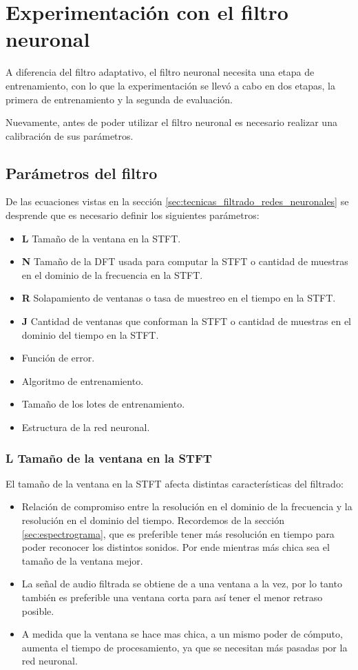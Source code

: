 \section{Experimentación con el filtro neuronal}

A diferencia del filtro adaptativo, el filtro neuronal necesita una etapa de entrenamiento, con lo que la experimentación se llevó a cabo en dos etapas, la primera de entrenamiento y la segunda de evaluación. 

Nuevamente, antes de poder utilizar el filtro neuronal es necesario realizar una calibración de sus parámetros.

\subsection{Parámetros del filtro}

De las ecuaciones vistas en la sección \ref{sec:tecnicas_filtrado_redes_neuronales} se desprende que es necesario definir los siguientes parámetros:

\begin{itemize}
	\item \textbf{L} Tamaño de la ventana en la STFT.
	\item \textbf{N} Tamaño de la DFT usada para computar la STFT o cantidad de muestras en el dominio de la frecuencia en la STFT.
	\item \textbf{R} Solapamiento de ventanas o tasa de muestreo en el tiempo en la STFT.
	\item \textbf{J} Cantidad de ventanas que conforman la STFT o cantidad de muestras en el dominio del tiempo en la STFT. 
	\item Función de error.
	\item Algoritmo de entrenamiento.
	\item Tamaño de los lotes de entrenamiento.
	\item Estructura de la red neuronal.
\end{itemize}

\subsubsection{L Tamaño de la ventana en la STFT}

El tamaño de la ventana en la STFT afecta distintas características del filtrado:

\begin{itemize}
	\item Relación de compromiso entre la resolución en el dominio de la frecuencia y la resolución en el dominio del tiempo. Recordemos de la sección \ref{sec:espectrograma}, que es preferible tener más resolución en tiempo para poder reconocer los distintos sonidos. Por ende mientras más chica sea el tamaño de la ventana mejor.
	\item La señal de audio filtrada se obtiene de a una ventana a la vez, por lo tanto también es preferible una ventana corta para así tener el menor retraso posible.
	\item A medida que la ventana se hace mas chica, a un mismo poder de cómputo, aumenta el tiempo de procesamiento, ya que se necesitan más pasadas por la red neuronal.
\end{itemize}

